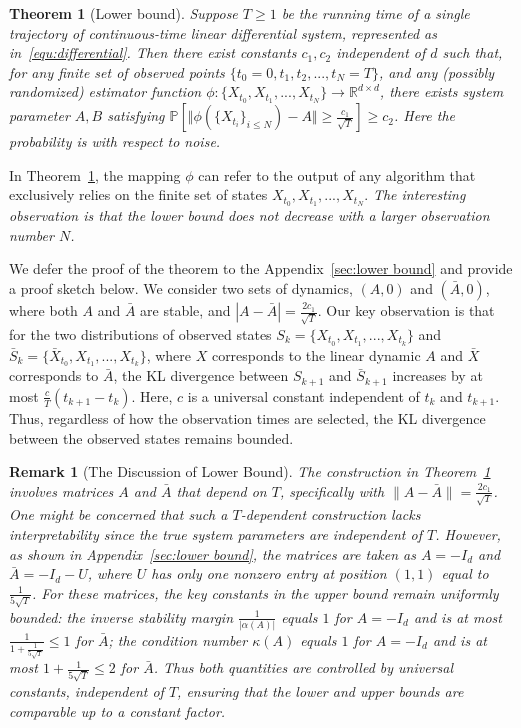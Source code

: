 \documentclass{article}
\newtheorem{theorem}{Theorem}
\newtheorem{remark}{Remark}
\theoremstyle{definition}
\begin{document}
\begin{theorem}[Lower bound]\label{thm:lower bound}
Suppose $T\geq 1$ be the running time of a single trajectory of continuous-time linear differential system, represented as in~\eqref{equ:differential}. Then there exist constants $c_{1},c_{2}$ independent of $d$ such that, for any finite set of observed points $\{t_{0}=0,t_{1},t_{2},...,t_{N}=T\}$, and any (possibly randomized) estimator function $\phi : \{X_{t_{0}},X_{t_{1}},...,X_{t_{N}}\}\to \mathbb{R}^{d\times d}$, there exists system parameter $A,B$ satisfying $\mathbb{P}\left[\Vert \phi(\{X_{t_i}\}_{i \le N}) - A\Vert\geq \frac{c_{1}}{\sqrt{T}}\right]\geq c_{2}$. Here the probability is with respect to noise.
\end{theorem}

In Theorem~\ref{thm:lower bound}, the mapping $\phi$ can refer to the output of any algorithm that exclusively relies on the finite set of states ${X_{t_{0}},X_{t_{1}},...,X_{t_{N}}}$. \emph{The interesting observation is that the lower bound does not decrease with a larger observation number $N$.}

We defer the proof of the theorem to the Appendix~\ref{sec:lower bound} and provide a proof sketch below. We consider two sets of dynamics, $(A,0)$ and $(\bar{A},0)$, where both $A$ and $\bar{A}$ are stable, and $|A-\bar{A}| = \frac{2c_{1}}{\sqrt{T}}$. Our key observation is that for the two distributions of observed states $S_{k}=\{X_{t_{0}},X_{t_{1}},...,X_{t_{k}}\}$ and $\bar{S}_{k}=\{\bar{X}_{t_{0}},X_{t_{1}},...,X_{t_{k}}\}$, where $X$ corresponds to the linear dynamic $A$ and $\bar{X}$ corresponds to $\bar{A}$, the KL divergence between $S_{k+1}$ and $\bar{S}_{k+1}$ increases by at most $\frac{c}{T}(t_{k+1}-t_{k})$. Here, $c$ is a universal constant independent of $t_{k}$ and $t_{k+1}$. Thus, regardless of how the observation times are selected, the KL divergence between the observed states remains bounded.

\begin{remark}[The Discussion of Lower Bound]
\normalfont

The construction in Theorem~\ref{thm:lower bound} involves matrices $A$ and $\bar{A}$ that depend on $T$, specifically with $\lVert A - \bar{A} \rVert = \tfrac{2c_{1}}{\sqrt{T}}$. 
One might be concerned that such a $T$-dependent construction lacks interpretability since the true system parameters are independent of $T$. 
However, as shown in Appendix~\ref{sec:lower bound}, the matrices are taken as $A = -I_{d}$ and $\bar{A} = -I_{d} - U$, where $U$ has only one nonzero entry at position $(1,1)$ equal to $\tfrac{1}{5\sqrt{T}}$. 
For these matrices, the key constants in the upper bound remain uniformly bounded: the inverse stability margin $\tfrac{1}{|\alpha(A)|}$ equals $1$ for $A=-I_{d}$ and is at most $\tfrac{1}{1+\tfrac{1}{5\sqrt{T}}} \leq 1$ for $\bar{A}$; the condition number $\kappa(A)$ equals $1$ for $A=-I_{d}$ and is at most $1+\tfrac{1}{5\sqrt{T}} \leq 2$ for $\bar{A}$. 
Thus both quantities are controlled by universal constants, independent of $T$, ensuring that the lower and upper bounds are comparable up to a constant factor.
\end{remark}
\end{document}
